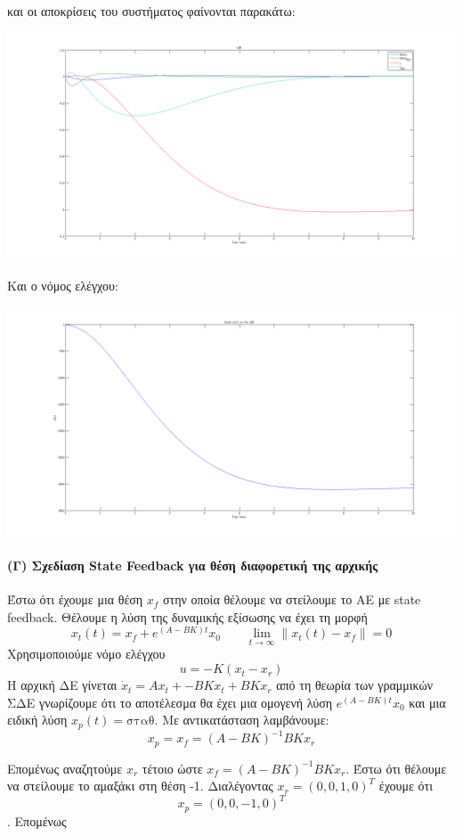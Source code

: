 \documentclass[a4paper,oneside, 12pt]{article}
\begin{document}
και οι αποκρίσεις του συστήματος φαίνονται παρακάτω: 

\includegraphics[width=\textwidth]{B.png}

Και ο νόμος ελέγχου:  
 
\includegraphics[width=\textwidth]{input_lqr.png}


\paragraph{(Γ) Σχεδίαση State Feedback για θέση διαφορετική της αρχικής} Έστω ότι έχουμε μια θέση $x_f$ στην οποία θέλουμε να στείλουμε το ΑΕ με state feedback. Θέλουμε η λύση της δυναμικής εξίσωσης να έχει τη μορφή $$x_t(t) = x_f + e^{(A - BK)t} x_0 \qquad \lim_{t \to \infty} \| x_t(t) - x_f \| = 0$$
Χρησιμοποιούμε νόμο ελέγχου $$u = -K(x_t -x_r) $$
Η αρχική ΔΕ γίνεται $\dot x_t = Ax_t + -BKx_t +B Κx_r$
από τη θεωρία των γραμμικών ΣΔΕ γνωρίζουμε ότι το αποτέλεσμα θα έχει μια ομογενή λύση $e^{(A - BK)t}x_0$ και μια ειδική λύση $x_p(t) = \text{σταθ}$. Με αντικατάσταση λαμβάνουμε: $$x_p = x_f = (A - BK)^{-1} BK x_r$$

Επομένως αναζητούμε $x_r$ τέτοιο ώστε $x_f = (A - BK)^{-1} BK x_r$. Έστω ότι θέλουμε να στείλουμε το αμαξάκι στη θέση -1. Διαλέγοντας $x_r = (0, 0, 1, 0)^T$ έχουμε ότι $$x_p = (0, 0, -1, 0)^T$$. Επομένως 
\end{document}
